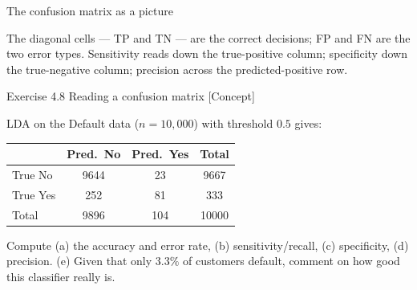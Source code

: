 \documentclass[aspectratio=169,11pt]{beamer}
\begin{document}
\begin{frame}{The confusion matrix as a picture}
  \begin{center}
  \end{center}
  \begin{takeaway}
    The diagonal cells --- TP and TN --- are the correct decisions; FP and
    FN are the two error types. Sensitivity reads down the true-positive
    column; specificity down the true-negative column; precision across the
    predicted-positive row.
  \end{takeaway}
\end{frame}


\begin{frame}{Exercise 4.8 \textemdash{} Reading a confusion matrix [Concept]}
\begin{exercise}
LDA on the Default data ($n=10{,}000$) with threshold $0.5$ gives:
\begin{center}\small
\begin{tabular}{l|cc|c}
\toprule
 & Pred.\ No & Pred.\ Yes & Total \\
\midrule
True No  & 9644 & 23 & 9667 \\
True Yes & 252  & 81 & 333 \\
\midrule
Total & 9896 & 104 & 10000 \\
\bottomrule
\end{tabular}
\end{center}
Compute (a) the accuracy and error rate, (b) sensitivity/recall,
(c) specificity, (d) precision. (e) Given that only $3.3\%$ of
customers default, comment on how good this classifier really is.
\end{exercise}
\end{frame}
\end{document}
